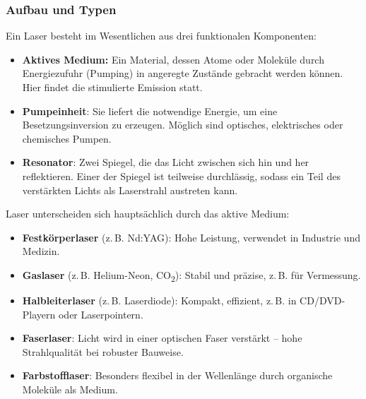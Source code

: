 \subsubsection{Aufbau und Typen}

Ein Laser besteht im Wesentlichen aus drei funktionalen Komponenten:

\begin{itemize}
	\item \textbf{Aktives Medium:} Ein Material, dessen Atome oder Moleküle durch Energiezufuhr (Pumping) in angeregte Zustände gebracht werden können. Hier findet die stimulierte Emission statt.
	\item \textbf{Pumpeinheit}: Sie liefert die notwendige Energie, um eine Besetzungsinversion zu erzeugen. Möglich sind optisches, elektrisches oder chemisches Pumpen.
	\item \textbf{Resonator}: Zwei Spiegel, die das Licht zwischen sich hin und her reflektieren. Einer der Spiegel ist teilweise durchlässig, sodass ein Teil des verstärkten Lichts als Laserstrahl austreten kann.
\end{itemize}

\begin{tcolorbox}[didaktikbox, title={Typenvielfalt von Lasern – ein Überblick}]
	\label{box:Typenvielfalt von Lasern}
	Laser unterscheiden sich hauptsächlich durch das aktive Medium:
	\begin{itemize}
		\item \textbf{Festkörperlaser} (z.\,B. Nd:YAG): Hohe Leistung, verwendet in Industrie und Medizin.
		\item \textbf{Gaslaser} (z.\,B. Helium-Neon, CO\textsubscript{2}): Stabil und präzise, z.\,B. für Vermessung.
		\item \textbf{Halbleiterlaser} (z.\,B. Laserdiode): Kompakt, effizient, z.\,B. in CD/DVD-Playern oder Laserpointern.
		\item \textbf{Faserlaser}: Licht wird in einer optischen Faser verstärkt – hohe Strahlqualität bei robuster Bauweise.
		\item \textbf{Farbstofflaser}: Besonders flexibel in der Wellenlänge durch organische Moleküle als Medium.
	\end{itemize}
\end{tcolorbox}

